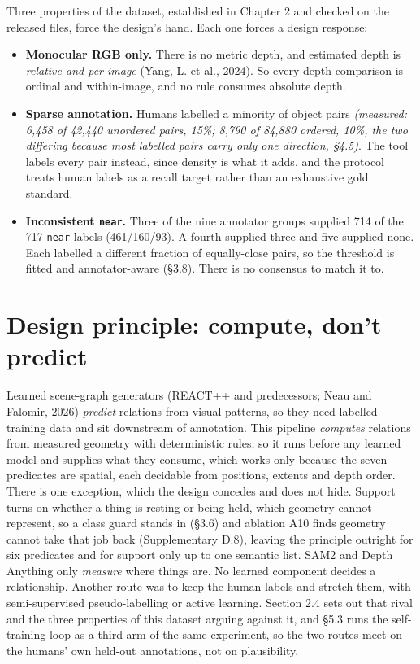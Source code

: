 Three properties of the dataset, established in Chapter 2 and checked on the released files, force the design's hand. Each one forces a design response:

\begin{itemize}
\item \textbf{Monocular RGB only.} There is no metric depth, and estimated depth is \textit{relative and per-image} (Yang, L. et al., 2024). So every depth comparison is ordinal and within-image, and no rule consumes absolute depth.
\item \textbf{Sparse annotation.} Humans labelled a minority of object pairs \textit{(measured: 6,458 of 42,440 unordered pairs, 15\%; 8,790 of 84,880 ordered, 10\%, the two differing because most labelled pairs carry only one direction, \S{}4.5)}. The tool labels every pair instead, since density is what it adds, and the protocol treats human labels as a recall target rather than an exhaustive gold standard.
\item \textbf{Inconsistent \texttt{near}.} Three of the nine annotator groups supplied 714 of the 717 \texttt{near} labels (461/160/93). A fourth supplied three and five supplied none. Each labelled a different fraction of equally-close pairs, so the threshold is fitted and annotator-aware (\S{}3.8). There is no consensus to match it to.
\end{itemize}

\section{Design principle: compute, don't predict}

Learned scene-graph generators (REACT++ and predecessors; Neau and Falomir, 2026) \textit{predict} relations from visual patterns, so they need labelled training data and sit downstream of annotation. This pipeline \textit{computes} relations from measured geometry with deterministic rules, so it runs before any learned model and supplies what they consume, which works only because the seven predicates are spatial, each decidable from positions, extents and depth order. There is one exception, which the design concedes and does not hide. Support turns on whether a thing is resting or being held, which geometry cannot represent, so a class guard stands in (\S{}3.6) and ablation A10 finds geometry cannot take that job back (Supplementary D.8), leaving the principle outright for six predicates and for support only up to one semantic list. SAM2 and Depth Anything only \textit{measure} where things are. No learned component decides a relationship. Another route was to keep the human labels and stretch them, with semi-supervised pseudo-labelling or active learning. Section 2.4 sets out that rival and the three properties of this dataset arguing against it, and \S{}5.3 runs the self-training loop as a third arm of the same experiment, so the two routes meet on the humans' own held-out annotations, not on plausibility.


